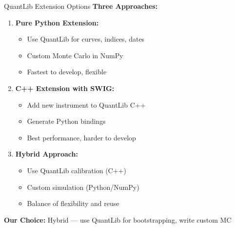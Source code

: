 \documentclass[aspectratio=169,11pt]{beamer}
\begin{document}
\begin{frame}{QuantLib Extension Options}
\textbf{Three Approaches:}

\begin{enumerate}
    \item \textbf{Pure Python Extension:}
    \begin{itemize}
        \item Use QuantLib for curves, indices, dates
        \item Custom Monte Carlo in NumPy
        \item Fastest to develop, flexible
    \end{itemize}

    \item \textbf{C++ Extension with SWIG:}
    \begin{itemize}
        \item Add new instrument to QuantLib C++
        \item Generate Python bindings
        \item Best performance, harder to develop
    \end{itemize}

    \item \textbf{Hybrid Approach:}
    \begin{itemize}
        \item Use QuantLib calibration (C++)
        \item Custom simulation (Python/NumPy)
        \item Balance of flexibility and reuse
    \end{itemize}
\end{enumerate}

\textbf{Our Choice:} Hybrid --- use QuantLib for bootstrapping, write custom MC
\end{frame}
\end{document}
